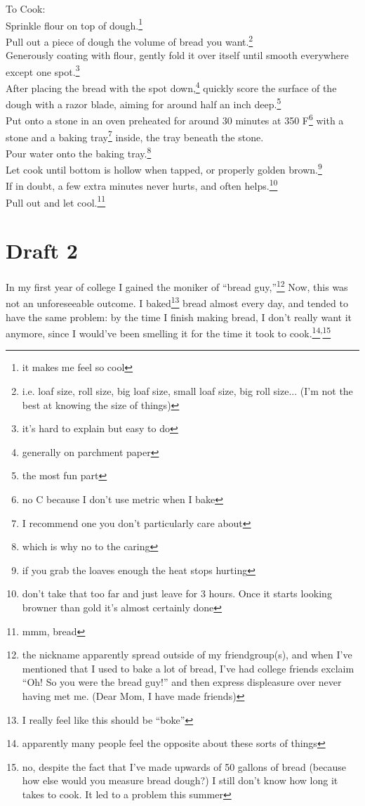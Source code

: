 \documentclass[12pt]{article}[titlepage]
\newcommand{\say}[1]{``#1''}
\newcommand{\1}{\={a}}
\newcommand{\2}{\={e}}
\newcommand{\3}{\={\i}}
\newcommand{\4}{\=o}
\newcommand{\5}{\=u}
\newcommand{\6}{\={A}}
\renewcommand{\,}{\textsuperscript{,}}
\begin{document}
To Cook:\\
Sprinkle flour on top of dough.\footnote{it makes me feel so cool}\\
Pull out a piece of dough the volume of bread you want.\footnote{i.e. loaf size, roll size, big loaf size, small loaf size, big roll size... (I'm not the best at knowing the size of things)}\\
Generously coating with flour, gently fold it over itself until smooth everywhere except one spot.\footnote{it's hard to explain but easy to do}\\
After placing the bread with the spot down,\footnote{generally on parchment paper} quickly score the surface of the dough with a razor blade, aiming for around half an inch deep.\footnote{the most fun part}\\
Put onto a stone in an oven preheated for around 30 minutes at 350 F\footnote{no C because I don't use metric when I bake} with a stone and a baking tray\footnote{I recommend one you don't particularly care about} inside, the tray beneath the stone.\\
Pour water onto the baking tray.\footnote{which is why no to the caring}\\
Let cook until bottom is hollow when tapped, or properly golden brown.\footnote{if you grab the loaves enough the heat stops hurting}\\
If in doubt, a few extra minutes never hurts, and often helps.\footnote{don't take that too far and just leave for 3 hours. Once it starts looking browner than gold it's almost certainly done}\\
Pull out and let cool.\footnote{mmm, bread}\\

\section{Draft 2}
In my first year of college I gained the moniker of \say{bread guy,}\footnote{the nickname apparently spread outside of my friendgroup(s), and when I've mentioned that I used to bake a lot of bread, I've had college friends exclaim \say{Oh! So you were the bread guy!} and then express displeasure over never having met me. (Dear Mom, I have made friends)}
Now, this was not an unforeseeable outcome.
I baked\footnote{I really feel like this should be \say{boke}} bread almost every day, and tended to have the same problem: by the time I finish making bread, I don't really want it anymore, since I would've been smelling it for the time it took to cook.\footnote{apparently many people feel the opposite about these sorts of things}\,\footnote{no, despite the fact that I've made upwards of 50 gallons of bread (because how else would you measure bread dough?) I still don't know how long it takes to cook. It led to a problem this summer}
\end{document}
